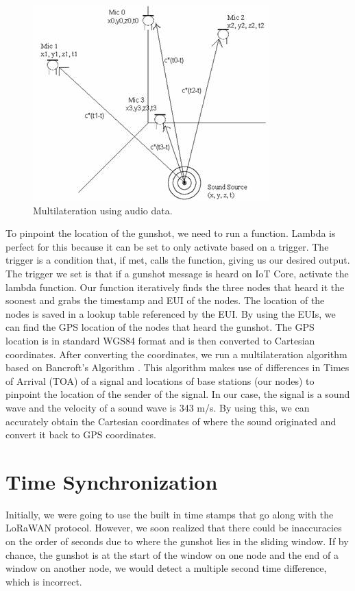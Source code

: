 \documentclass[conference]{IEEEtran}
\begin{document}
\begin{figure}[htbp]
\centerline{\includegraphics[width=0.7\columnwidth]{triangulate.png}}
\caption{Multilateration using audio data.}
\label{fig}
\end{figure}
To pinpoint the location of the gunshot, we need to run a function. Lambda is perfect for this because it can be set to only activate based on a trigger. The trigger is a condition that, if met, calls the function, giving us our desired output. The trigger we set is that if a gunshot message is heard on IoT Core, activate the lambda function. Our function iteratively finds the three nodes that heard it the soonest and grabs the timestamp and EUI of the nodes. The location of the nodes is saved in a lookup table referenced by the EUI. By using the EUIs, we can find the GPS location of the nodes that heard the gunshot. The GPS location is in standard WGS84 format and is then converted to Cartesian coordinates. After converting the coordinates, we run a multilateration algorithm based on Bancroft’s Algorithm \cite{b5}. This algorithm makes use of differences in Times of Arrival (TOA) of a signal and locations of base stations (our nodes) to pinpoint the location of the sender of the signal. In our case, the signal is a sound wave and the velocity of a sound wave is 343 m/s. By using this, we can accurately obtain the Cartesian coordinates of where the sound originated and convert it back to GPS coordinates.



\section{Time Synchronization}
Initially, we were going to use the built in time stamps that go along with the LoRaWAN protocol. However, we soon realized that there could be inaccuracies on the order of seconds due to where the gunshot lies in the sliding window. If by chance, the gunshot is at the start of the window on one node and the end of a window on another node, we would detect a multiple second time difference, which is incorrect. 
\end{document}
